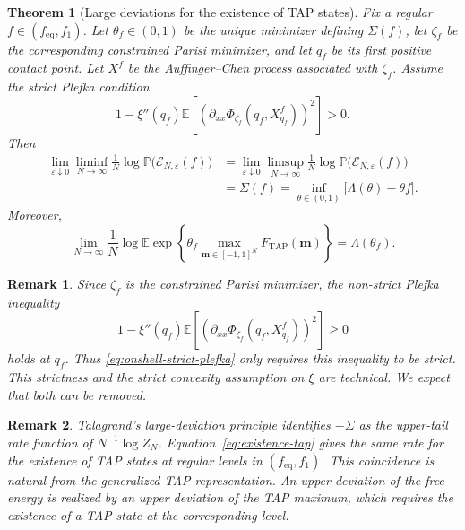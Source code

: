 \documentclass[a4paper,10pt,reqno]{amsart}
\numberwithin{equation}{section}
\newtheorem{theorem}{Theorem}%
\newtheorem{remark}{Remark}[section]%
\newcommand{\ve}{\varepsilon}
\newcommand{\dP}{\mathbb{P}}%
\newcommand{\dE}{\mathbb{E}}%
\newcommand{\mc}{\mathcal}
\newcommand{\TAP}{\mathrm{TAP}}
\newcommand{\eq}{\mathrm{eq}}
\newcommand{\bfm}{\mathbf{m}}
\begin{document}
	\begin{theorem}[Large deviations for the existence of TAP states]
		\label{thm:legendre}
		Fix a regular \(f\in(f_{\eq},f_1)\). Let \(\theta_f\in(0,1)\) be the
		unique minimizer defining \(\Sigma(f)\), let \(\zeta_f\) be the
		corresponding constrained Parisi minimizer, and let \(q_f\) be its first
		positive contact point. Let \(X^f\) be the Auffinger--Chen process
		associated with \(\zeta_f\). Assume the strict Plefka condition
		\begin{equation}\label{eq:onshell-strict-plefka}
			1-\xi''(q_f)\dE\left[
			\left(
			\partial_{xx}\Phi_{\zeta_f}(q_f,X^f_{q_f})
			\right)^2
			\right]>0.
		\end{equation}
		Then
		\begin{equation}\label{eq:existence-tap}
			\begin{aligned}
				\lim_{\ve\downarrow0}\liminf_{N\to\infty}
				\frac1N\log\dP\bigl(\mc E_{N,\ve}(f)\bigr)
				&=
				\lim_{\ve\downarrow0}\limsup_{N\to\infty}
				\frac1N\log\dP\bigl(\mc E_{N,\ve}(f)\bigr)\\
				&=
				\Sigma(f)
				=
				\inf_{\theta\in(0,1)}
				\bigl[\Lambda(\theta)-\theta f\bigr].
			\end{aligned}
		\end{equation}
		Moreover,
		\begin{equation}\label{eq:legendre}
			\lim_{N\to\infty}
			\frac1N
			\log
			\dE\exp\left\{
			\theta_f\max_{\bfm\in[-1,1]^N}F_{\TAP}(\bfm)
			\right\}
			=
			\Lambda(\theta_f).
		\end{equation}
	\end{theorem}
	
	\begin{remark}
		Since \(\zeta_f\) is the constrained Parisi minimizer, the non-strict
		Plefka inequality
		\[
		1-\xi''(q_f)\dE\left[
		\left(
		\partial_{xx}\Phi_{\zeta_f}(q_f,X^f_{q_f})
		\right)^2
		\right]\ge0
		\]
		holds at \(q_f\). Thus \eqref{eq:onshell-strict-plefka} only requires
		this inequality to be strict. This strictness and the strict convexity
		assumption on \(\xi\) are technical. We expect that both can be removed.
	\end{remark}
	
	
	
	\begin{remark}
		Talagrand's large-deviation principle
		\cite[Section~7]{LDTalagrand} identifies
		\(-\Sigma\) as the upper-tail rate function of
		\(N^{-1}\log Z_N\). Equation~\eqref{eq:existence-tap} gives the same
		rate for the existence of TAP states at regular levels in
		\((f_{\eq},f_1)\). This coincidence is natural from the generalized
		TAP representation. An upper deviation of the free energy is realized
		by an upper deviation of the TAP maximum, which requires the existence
		of a TAP state at the corresponding level.
	\end{remark}
	
\end{document}
